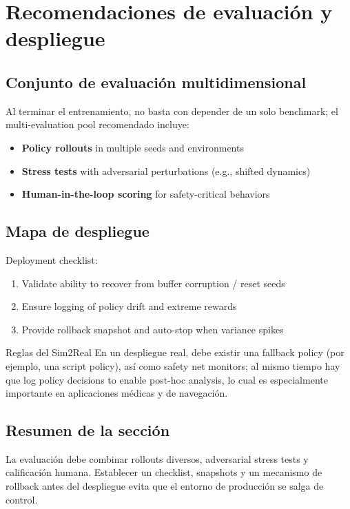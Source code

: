 \section{Recomendaciones de evaluación y despliegue}

\subsection{Conjunto de evaluación multidimensional}

Al terminar el entrenamiento, no basta con depender de un solo benchmark; el multi-evaluation pool recomendado incluye:

\begin{itemize}
    \item \textbf{Policy rollouts} in multiple seeds and environments
    \item \textbf{Stress tests} with adversarial perturbations (e.g., shifted dynamics)
    \item \textbf{Human-in-the-loop scoring} for safety-critical behaviors
\end{itemize}

\subsection{Mapa de despliegue}

Deployment checklist:

\begin{enumerate}
    \item Validate ability to recover from buffer corruption / reset seeds
    \item Ensure logging of policy drift and extreme rewards
    \item Provide rollback snapshot and auto-stop when variance spikes
\end{enumerate}

\begin{importantbox}{Reglas del Sim2Real}
En un despliegue real, debe existir una fallback policy (por ejemplo, una script policy), así como safety net monitors; al mismo tiempo hay que log policy decisions to enable post-hoc analysis, lo cual es especialmente importante en aplicaciones médicas y de navegación.
\end{importantbox}

\subsection{Resumen de la sección}

La evaluación debe combinar rollouts diversos, adversarial stress tests y calificación humana. Establecer un checklist, snapshots y un mecanismo de rollback antes del despliegue evita que el entorno de producción se salga de control.

